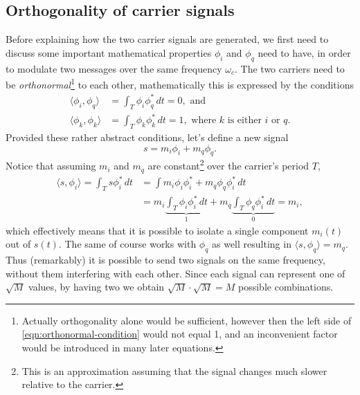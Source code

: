 \subsection{Orthogonality of carrier signals}

Before explaining how the two carrier signals are generated, we first need to discuss some important mathematical properties \(\phi_i\) and \(\phi_q\) need to have, in order to modulate two messages over the same frequency \(\omega_c\). The two carriers need to be \emph{orthonormal}\footnote{Actually orthogonality alone would be sufficient, however then the left side of \eqref{eqn:orthonormal-condition} would not equal 1, and an inconvenient factor would be introduced in many later equations.} to each other, mathematically this is expressed by the conditions
\begin{subequations} \label{eqn:orthonormal-conditions}
	\begin{align}
		\langle \phi_i, \phi_q \rangle
			&= \int_T \phi_i \phi_q^* \, dt
			= 0, \text{ and } \label{eqn:orthogonal-condition} \\
		\langle \phi_k, \phi_k \rangle
			&= \int_T \phi_k \phi_k^*  \,dt = 1,
			\text{ where } k \text{ is either } i \text{ or } q. \label{eqn:orthonormal-condition}
	\end{align}
\end{subequations}
Provided these rather abstract conditions, let's define a new signal 
\begin{equation}
	s = m_i\phi_i + m_q\phi_q.
\end{equation}
Notice that assuming \(m_i\) and \(m_q\) are constant\footnote{This is an approximation assuming that the signal changes much slower relative to the carrier.} over the carrier's period \(T\),
\begin{align*}
	\langle s, \phi_i \rangle = \int_T s \phi_i^* \,dt
		&= \int m_i \phi_i \phi_i^* + m_q \phi_q \phi_i^* \,dt \\
		&= m_i \underbrace{\int_T \phi_i \phi_i^* \,dt}_{1}
			+ m_q \underbrace{\int_T \phi_q \phi_i^* \,dt}_{0} = m_i,
\end{align*}
which effectively means that it is possible to isolate a single component \(m_i(t)\) out of \(s(t)\). The same of course works with \(\phi_q\) as well resulting in \(\langle s, \phi_q \rangle = m_q\). Thus (remarkably) it is possible to send two signals on the same frequency, without them interfering with each other. Since each signal can represent one of \(\sqrt{M}\) values, by having two we obtain \(\sqrt{M} \cdot \sqrt{M} = M\) possible combinations.

